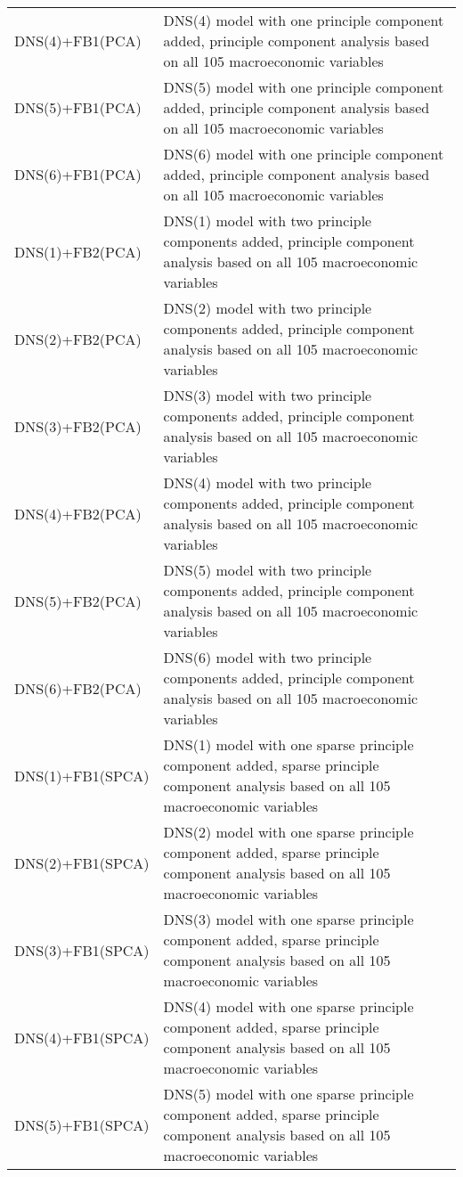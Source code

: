 \begin{footnotesize}
\begin{tabularx}{\linewidth}{lX}
DNS(4)+FB1(PCA)           & DNS(4) model with one principle component added, principle component analysis based on all 105 macroeconomic variables \\
DNS(5)+FB1(PCA)           & DNS(5) model with one principle component added, principle component analysis based on all 105 macroeconomic variables \\
DNS(6)+FB1(PCA)           & DNS(6) model with one principle component added, principle component analysis based on all 105 macroeconomic variables \\
DNS(1)+FB2(PCA)           & DNS(1) model with two principle components added, principle component analysis based on all 105 macroeconomic variables \\
DNS(2)+FB2(PCA)           & DNS(2) model with two principle components added, principle component analysis based on all 105 macroeconomic variables \\
DNS(3)+FB2(PCA)           & DNS(3) model with two principle components added, principle component analysis based on all 105 macroeconomic variables \\
DNS(4)+FB2(PCA)           & DNS(4) model with two principle components added, principle component analysis based on all 105 macroeconomic variables \\
DNS(5)+FB2(PCA)           & DNS(5) model with two principle components added, principle component analysis based on all 105 macroeconomic variables \\
DNS(6)+FB2(PCA)           & DNS(6) model with two principle components added, principle component analysis based on all 105 macroeconomic variables \\
DNS(1)+FB1(SPCA)          & DNS(1) model with one sparse principle component added, sparse principle component analysis based on all 105 macroeconomic variables \\
DNS(2)+FB1(SPCA)          & DNS(2) model with one sparse principle component added, sparse principle component analysis based on all 105 macroeconomic variables \\
DNS(3)+FB1(SPCA)          & DNS(3) model with one sparse principle component added, sparse principle component analysis based on all 105 macroeconomic variables \\
DNS(4)+FB1(SPCA)          & DNS(4) model with one sparse principle component added, sparse principle component analysis based on all 105 macroeconomic variables \\
DNS(5)+FB1(SPCA)          & DNS(5) model with one sparse principle component added, sparse principle component analysis based on all 105 macroeconomic variables \\

\end{tabularx}
\end{footnotesize}
